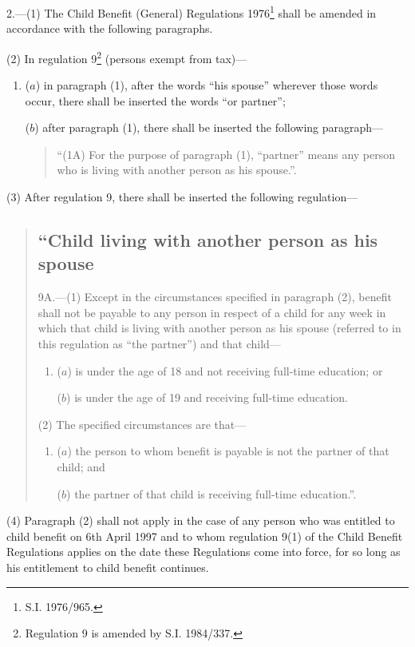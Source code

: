 \documentclass[a4paper]{article}
\newcommand\fnote[1]{\footnote{\frenchspacing #1}}
\begin{document}
2.---(1) The Child Benefit (General) Regulations 1976\fnote{S.I. 1976/965.} shall be amended in accordance with the following paragraphs.

(2) In regulation 9\fnote{Regulation 9 is amended by S.I. 1984/337.} (persons exempt from tax)— %
\begin{enumerate}\item[]
($a$) in paragraph (1), after the words “his spouse” wherever those words occur, there shall be inserted the words “or partner”;

($b$) after paragraph (1), there shall be inserted the following paragraph—
\begin{quotation}
“(1A) For the purpose of paragraph (1), “partner” means any person who is living with another person as his spouse.”.
\end{quotation}
\end{enumerate}

(3) After regulation 9, there shall be inserted the following regulation—
\begin{quotation}
\subsection*{“Child living with another person as his spouse}

9A.—(1) Except in the circumstances specified in paragraph (2), benefit shall not be payable to any person in respect of a child for any week in which that child is living with another person as his spouse (referred to in this regulation as “the partner”) and that child— %
\begin{enumerate}\item[]
($a$) is under the age of 18 and not receiving full-time education; or

($b$) is under the age of 19 and receiving full-time education.
\end{enumerate}

(2) The specified circumstances are that—
\begin{enumerate}\item[]
($a$) the person to whom benefit is payable is not the partner of that child; and

($b$) the partner of that child is receiving full-time education.”.
\end{enumerate}
\end{quotation}

(4) Paragraph (2) shall not apply in the case of any person who was entitled to child benefit on 6th April 1997 and to whom regulation 9(1) of the Child Benefit Regulations applies on the date these Regulations come into force, for so long as his entitlement to child benefit continues. %
\end{document}
